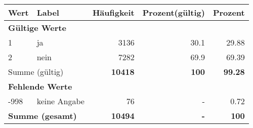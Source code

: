      \begin{longtable}{lXrrr}
     \toprule
     \textbf{Wert} & \textbf{Label} & \textbf{Häufigkeit} & \textbf{Prozent(gültig)} & \textbf{Prozent} \\
     \endhead
     \midrule
     \multicolumn{5}{l}{\textbf{Gültige Werte}}\\

     1 &
     \multicolumn{1}{X}{ ja   } &


       \num{3136} &
       \num[round-mode=places,round-precision=2]{30,1} &
         \num[round-mode=places,round-precision=2]{29,88} \\

     2 &
     \multicolumn{1}{X}{ nein   } &


       \num{7282} &
       \num[round-mode=places,round-precision=2]{69,9} &
         \num[round-mode=places,round-precision=2]{69,39} \\
     \midrule
     \multicolumn{2}{l}{Summe (gültig)} &
       \textbf{\num{10418}} &
     \textbf{100} &
       \textbf{\num[round-mode=places,round-precision=2]{99,28}} \\
     \multicolumn{5}{l}{\textbf{Fehlende Werte}}\\
       -998 &
       keine Angabe &
         \num{76} &
        - &
         \num[round-mode=places,round-precision=2]{0,72} \\
     \midrule
     \multicolumn{2}{l}{\textbf{Summe (gesamt)}} &
          \textbf{\num{10494}} &
        \textbf{-} &
        \textbf{100} \\
     \bottomrule
     \end{longtable}
     
